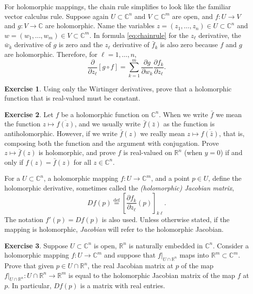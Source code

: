 \documentclass[12pt,openany]{book}
\newcommand{\C}{{\mathbb{C}}}
\newcommand{\R}{{\mathbb{R}}}
\newcommand{\myindex}[1]{#1\index{#1}}
\theoremstyle{plain}
\theoremstyle{remark}
\theoremstyle{definition}
\newenvironment{exbox}{%
    \def\FrameCommand{\vrule width 1pt \relax\hspace{10pt}}%
    \MakeFramed{\advance\hsize-\width\FrameRestore}%
}{%
    \endMakeFramed
}
\theoremstyle{exercise}
\newtheorem{exercise}{Exercise}[section]
\theoremstyle{example}
\begin{document}
For holomorphic mappings, the chain rule simplifies to look like
the familiar vector calculus rule.
Suppose again
$U \subset \C^n$ and $V \subset \C^m$ are open, and
$f \colon U \to V$ and $g \colon V \to \C$ are holomorphic.
Name the variables
$z = (z_1,\ldots,z_n) \in U \subset \C^n$ and $w = (w_1,\ldots,w_m) \in V
\subset \C^m$.  In formula \eqref{eq:chainrule} for the $z_\ell$ derivative,
the $\bar{w}_k$ derivative of $g$ is zero and the $z_\ell$ derivative of
$\bar{f}_k$ is also zero because $f$ and $g$ are holomorphic.
Therefore, for $\ell=1,\ldots,n$,
\begin{equation*}
\frac{\partial}{\partial z_\ell} \left[ g \circ f \right]
=
\sum_{k=1}^m
\frac{\partial g}{\partial w_k}
\frac{\partial f_k}{\partial z_\ell} .
\end{equation*}

\begin{exbox}
\begin{exercise}
Using only the Wirtinger derivatives, prove that a holomorphic function
that is real-valued must be constant.
\end{exercise}

\begin{exercise}
Let $f$ be a holomorphic function on $\C^n$.
When we write $\bar{f}$ we mean the function $z \mapsto \overline{f(z)}$,
and we usually write $\bar{f}(\bar{z})$ as the function is antiholomorphic.
However,
if we write $\bar{f}(z)$ we really mean $z \mapsto \overline{f(\bar{z})}$,
that is, composing both the function and the argument with conjugation.
Prove $z \mapsto \bar{f}(z)$ is holomorphic, and prove $f$ is
real-valued on $\R^n$ (when $y=0$) if and only if $f(z) =
\bar{f}(z)$ for all $z \in \C^n$.
\end{exercise}
\end{exbox}

For a $U \subset \C^n$, a holomorphic mapping $f \colon U \to \C^m$,
and a point $p \in U$,
define the holomorphic derivative, sometimes called the
\emph{(holomorphic) \myindex{Jacobian matrix}},
%
\begin{equation*}
Df(p)
\overset{\text{def}}{=}
\left[
\frac{\partial f_k}{\partial z_\ell} (p)
\right]_{k \ell} .
\end{equation*}
The notation $f'(p) = Df(p)$ is also used.
Unless otherwise stated, if the mapping is holomorphic,
\emph{Jacobian} will refer to the holomorphic Jacobian.

\begin{exbox}
\begin{exercise}
Suppose $U \subset \C^n$ is open, $\R^n$ is naturally embedded in $\C^n$.
Consider a holomorphic mapping $f \colon U \to \C^m$ and suppose that
$f|_{U \cap \R^n}$ maps into $\R^m \subset \C^m$.  Prove that given
$p \in U \cap \R^n$, the real
Jacobian matrix at $p$ of the map
$f|_{U \cap \R^n} \colon U \cap \R^n \to \R^m$ is equal to the holomorphic
Jacobian matrix of the map $f$ at $p$.  In particular, $Df(p)$ is a matrix
with real entries.
\end{exercise}
\end{exbox}
\end{document}
